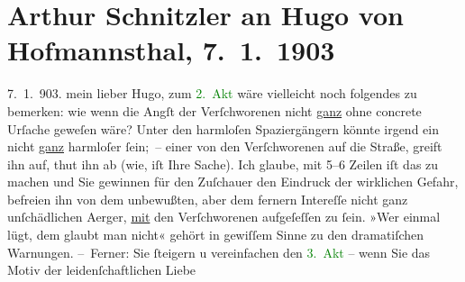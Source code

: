 

               \section[Arthur Schnitzler an Hugo von Hofmannsthal, 7. 1. 1903]{ Arthur Schnitzler an Hugo von Hofmannsthal, 7. 1. 1903}\nopagebreak{}\rehead{ }\normalsize\beginnumbering{} \toendnotes[C]{\smallbreak\pagebreak[2]} 
\toendnotes[C]{\smallbreak}\pstart
           {\pb}7. 1. 903.\pend
           \pstart
           mein lieber Hugo, zum \textcolor{green}{2. Akt}{} wäre vielleicht noch folgendes zu bemerken: wie wenn die Angſt der
               Verſchworenen nicht \uline{ganz} ohne concrete Urſache
               geweſen wäre? Unter den harmloſen Spaziergängern könnte irgend ein nicht \uline{ganz} harmloſer ſein; – einer von den Verſchworenen auf
               die Straße, greift ihn auf, thut ihn ab \introOben{}(wie, iſt Ihre
                  Sache)\introOben{}. Ich glaube, mit 5–6 Zeilen iſt das zu machen und Sie gewinnen für
               den Zuſchauer den Eindruck der wirklichen Gefahr, befreien ihn von {\pb}dem unbewußten, aber dem fernern Intereſſe nicht ganz
               unſchädlichen Aerger, \uline{mit} den Verſchworenen
               aufgeſeſſen zu ſein. »Wer einmal lügt, dem glaubt man nicht« gehört in gewiſſem Sinne
               zu den dramatiſchen Warnungen.\pend
           \pstart
           – Ferner: Sie ſteigern u vereinfachen den \textcolor{green}{3. Akt}{} – wenn Sie das Motiv der leidenſchaftlichen Liebe
